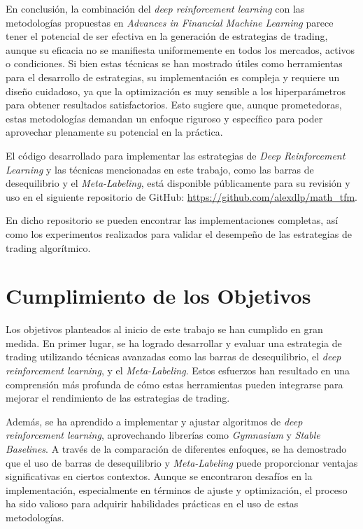\documentclass[a4paper,12pt, twoside]{report}
\begin{document}
En conclusión, la combinación del \textit{deep reinforcement learning} con las metodologías 
propuestas en \textit{Advances in Financial Machine Learning} parece tener el potencial 
de ser efectiva en la generación de estrategias de trading, aunque su eficacia no se 
manifiesta uniformemente en todos los mercados, activos o condiciones. Si bien estas 
técnicas se han mostrado útiles como herramientas para el desarrollo de estrategias, 
su implementación es compleja y requiere un diseño cuidadoso, ya que la optimización es 
muy sensible a los hiperparámetros para obtener resultados satisfactorios. Esto sugiere que, 
aunque prometedoras, estas metodologías demandan un enfoque riguroso y específico para 
poder aprovechar plenamente su potencial en la práctica.


El código desarrollado para implementar las estrategias de \textit{Deep Reinforcement Learning} 
y las técnicas mencionadas en este trabajo, como las barras de desequilibrio y el \textit{Meta-Labeling}, 
está disponible públicamente para su revisión y uso en el 
siguiente repositorio de GitHub: \url{https://github.com/alexdlp/math_tfm}. 

En dicho repositorio se pueden encontrar las implementaciones completas, así como los 
experimentos realizados para validar el desempeño de las estrategias de trading algorítmico.

\section{Cumplimiento de los Objetivos}

Los objetivos planteados al inicio de este trabajo se han cumplido en gran medida. En 
primer lugar, se ha logrado desarrollar y evaluar una estrategia de trading utilizando 
técnicas avanzadas como las barras de desequilibrio, el \textit{deep reinforcement learning}, 
y el \textit{Meta-Labeling}. Estos esfuerzos han resultado en una comprensión más profunda 
de cómo estas herramientas pueden integrarse para mejorar el rendimiento de las estrategias 
de trading.

Además, se ha aprendido a implementar y ajustar algoritmos de \textit{deep reinforcement learning}, 
aprovechando librerías como \textit{Gymnasium} y \textit{Stable Baselines}. A través de la 
comparación de diferentes enfoques, se ha demostrado que el uso de barras de desequilibrio 
y \textit{Meta-Labeling} puede proporcionar ventajas significativas en ciertos contextos. 
Aunque se encontraron desafíos en la implementación, especialmente en términos de ajuste 
y optimización, el proceso ha sido valioso para adquirir habilidades prácticas en el 
uso de estas metodologías.
\end{document}
